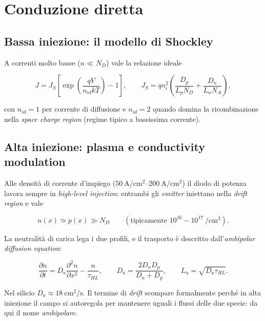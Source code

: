\documentclass[11pt,a4paper]{article}
\begin{document}
\section{Conduzione diretta}

\subsection{Bassa iniezione: il modello di Shockley}

A correnti molto basse ($n \ll N_D$) vale la relazione ideale

\begin{equation}
J = J_S \left[ \exp\!\left(\frac{qV}{n_{id} kT}\right) - 1 \right],
\qquad
J_S = q n_i^{2}\left(\frac{D_p}{L_p N_D} + \frac{D_n}{L_n N_A}\right),
\end{equation}

con $n_{id}=1$ per corrente di diffusione e $n_{id}=2$ quando domina la
ricombinazione nella \emph{space charge region} (regime tipico a bassissima
corrente).

\subsection{Alta iniezione: plasma e conductivity modulation}

Alle densità di corrente d'impiego ($\SIrange{50}{200}{\ampere\per\centi\meter\squared}$)
il diodo di potenza lavora sempre in \emph{high-level injection}: entrambi gli
\emph{emitter} iniettano nella \emph{drift region} e vale

\begin{equation}
n(x) \simeq p(x) \gg N_D \qquad (\text{tipicamente } 10^{16}\!-\!10^{17}\ \si{\per\centi\meter\cubed}).
\end{equation}

La neutralità di carica lega i due profili, e il trasporto è descritto
dall'\emph{ambipolar diffusion equation}:

\begin{equation}
\frac{\partial n}{\partial t}
= D_a \frac{\partial^{2} n}{\partial x^{2}} - \frac{n}{\tau_{HL}},
\qquad
D_a = \frac{2 D_n D_p}{D_n + D_p},
\qquad
L_a = \sqrt{D_a \tau_{HL}} .
\end{equation}

Nel silicio $D_a \approx \SI{18}{\centi\meter\squared\per\second}$. Il termine
di \emph{drift} scompare formalmente perché in alta iniezione il campo si
autoregola per mantenere uguali i flussi delle due specie: da qui il nome
\emph{ambipolare}.
\end{document}
